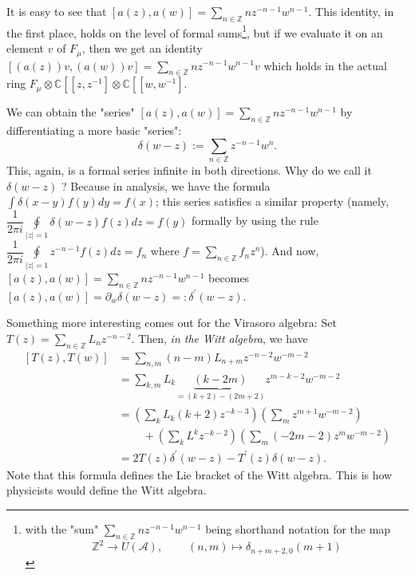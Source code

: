 \documentclass
[numbers=enddot,12pt,final,onecolumn,german,notitlepage]{scrartcl}%
\theoremstyle{definition}
\begin{document}
It is easy to see that $\left[  a\left(  z\right)  ,a\left(  w\right)
\right]  =\sum\limits_{n\in\mathbb{Z}}nz^{-n-1}w^{n-1}$. This identity, in the
first place, holds on the level of formal sums\footnote{with the "sum"
$\sum\limits_{n\in\mathbb{Z}}nz^{-n-1}w^{n-1}$ being shorthand notation for
the map
\[
\mathbb{Z}^{2}\rightarrow U\left(  \mathcal{A}\right)
,\ \ \ \ \ \ \ \ \ \ \left(  n,m\right)  \mapsto\delta_{n+m+2,0}\left(
m+1\right)
\]
}, but if we evaluate it on an element $v$ of $F_{\mu}$, then we get an
identity $\left[  \left(  a\left(  z\right)  \right)  v,\left(  a\left(
w\right)  \right)  v\right]  =\sum\limits_{n\in\mathbb{Z}}nz^{-n-1}w^{n-1}v$
which holds in the actual ring $F_{\mu}\otimes\mathbb{C}\left[  \left[
z,z^{-1}\right.  \right]  \otimes\mathbb{C}\left[  \left[  w,w^{-1}\right.
\right]  $.

We can obtain the "series" $\left[  a\left(  z\right)  ,a\left(  w\right)
\right]  =\sum\limits_{n\in\mathbb{Z}}nz^{-n-1}w^{n-1}$ by differentiating a
more basic "series":%
\[
\delta\left(  w-z\right)  :=\sum_{n\in\mathbb{Z}}z^{-n-1}w^{n}.
\]
This, again, is a formal series infinite in both directions. Why do we call it
$\delta\left(  w-z\right)  $ ? Because in analysis, we have the formula
$\int\delta\left(  x-y\right)  f\left(  y\right)  dy=f\left(  x\right)  $;
this series satisfies a similar property (namely, $\dfrac{1}{2\pi i}%
\oint\limits_{\left\vert z\right\vert =1}\delta\left(  w-z\right)  f\left(
z\right)  dz=f\left(  y\right)  $ formally by using the rule $\dfrac{1}{2\pi
i}\oint\limits_{\left\vert z\right\vert =1}z^{-n-1}f\left(  z\right)
dz=f_{n}$ where $f=\sum\limits_{n\in\mathbb{Z}}f_{n}z^{n}$). And now, $\left[
a\left(  z\right)  ,a\left(  w\right)  \right]  =\sum\limits_{n\in\mathbb{Z}%
}nz^{-n-1}w^{n-1}$ becomes $\left[  a\left(  z\right)  ,a\left(  w\right)
\right]  =\partial_{w}\delta\left(  w-z\right)  =:\delta^{\prime}\left(
w-z\right)  $.

Something more interesting comes out for the Virasoro algebra: Set $T\left(
z\right)  =\sum\limits_{n\in\mathbb{Z}}L_{n}z^{-n-2}$. Then, \textit{in the
Witt algebra}, we have%
\begin{align*}
\left[  T\left(  z\right)  ,T\left(  w\right)  \right]   &  =\sum
\limits_{n,m}\left(  n-m\right)  L_{n+m}z^{-n-2}w^{-m-2}\\
&  =\sum_{k,m}L_{k}\underbrace{\left(  k-2m\right)  }_{=\left(  k+2\right)
-\left(  2m+2\right)  }z^{m-k-2}w^{-m-2}\\
&  =\left(  \sum_{k}L_{k}\left(  k+2\right)  z^{-k-3}\right)  \left(  \sum
_{m}z^{m+1}w^{-m-2}\right) \\
&  \ \ \ \ \ \ \ \ \ \ +\left(  \sum_{k}L^{k}z^{-k-2}\right)  \left(  \sum
_{m}\left(  -2m-2\right)  z^{m}w^{-m-2}\right) \\
&  =2T\left(  z\right)  \delta^{\prime}\left(  w-z\right)  -T^{\prime}\left(
z\right)  \delta\left(  w-z\right)  .
\end{align*}
Note that this formula defines the Lie bracket of the Witt algebra. This is
how physicists would define the Witt algebra.
\end{document}
